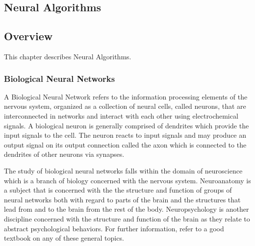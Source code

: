 

\renewcommand{\bibsection}{\subsection{\bibname}}
\begin{bibunit}

\chapter{Neural Algorithms}
\label{ch:neural}

\section{Overview}
This chapter describes Neural Algorithms.

\subsection{Biological Neural Networks}
A Biological Neural Network refers to the information processing elements of the nervous system, organized as a collection of neural cells, called neurons, that are interconnected in networks and interact with each other using electrochemical signals.
A biological neuron is generally comprised of dendrites which provide the input signals to the cell. The neuron reacts to input signals and may produce an output signal on its output connection called the axon which is connected to the dendrites of other neurons via synapses.

The study of biological neural networks falls within the domain of neuroscience which is a branch of biology concerned with the nervous system. 
Neuroanatomy is a subject that is concerned with the the structure and function of groups of neural networks both with regard to parts of the brain and the structures that lead from and to the brain from the rest of the body. 
Neuropsychology is another discipline concerned with the structure and function of the brain as they relate to abstract psychological behaviors.
For further information, refer to a good textbook on any of these general topics.


\end{bibunit}

